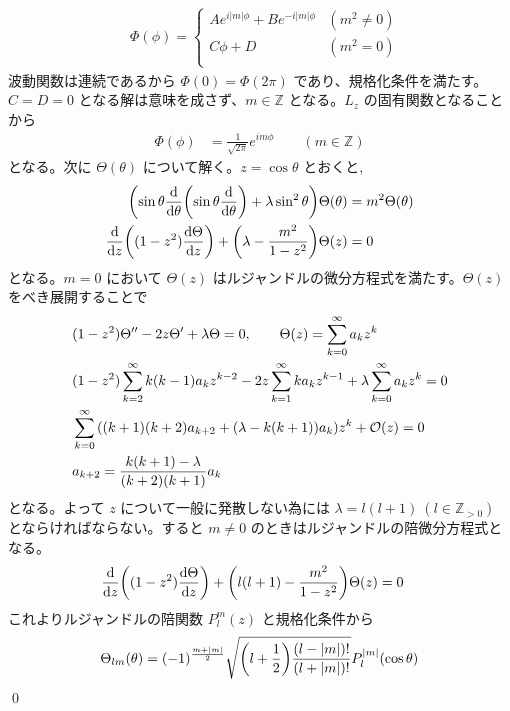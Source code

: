 \documentclass[uplatex,dvipdfmx,a4paper,11pt]{jlreq}
\makeatletter
\newcommand{\ZZ}{\mathbb{Z}}
\theoremstyle{definition}
\renewenvironment{proof}[1][\proofname]{\par
  \normalfont
  \topsep6\p@\@plus6\p@ \trivlist
  \item[\hskip\labelsep{\bfseries #1}\@addpunct{\bfseries}]\ignorespaces\quad\par
}{%
  \qed\endtrivlist\@endpefalse
}
\renewcommand\proofname{証明}
\makeatother
\begin{document}
\begin{proof}
\begin{align}
     & \Phi(\phi) = \begin{cases}
                      Ae^{i|m|\phi} + Be^{-i|m|\phi} & (m^2 \neq 0) \\
                      C\phi + D                      & (m^2 = 0)    \\
                    \end{cases}
  \end{align}
  波動関数は連続であるから $\Phi(0) = \Phi(2\pi)$ であり、規格化条件を満たす。$C = D = 0$ となる解は意味を成さず、$m\in\ZZ$ となる。$L_z$ の固有関数となることから
  \begin{align}
    \Phi(\phi) & = \frac{1}{\sqrt{2\pi}}e^{im\phi} \qquad (m\in\ZZ)
  \end{align}
  となる。次に $\Theta(\theta)$ について解く。$z = \cos\theta$ とおくと,
  \begin{align}
    \qty(\sin\theta\dv{\theta}\qty(\sin\theta\dv{\theta}) + \lambda \sin^2\theta)\Theta(\theta) & = m^2\Theta(\theta) \\
    \dv{z}\qty((1 - z^2)\dv{\Theta}{z}) + \qty(\lambda - \frac{m^2}{1 - z^2})\Theta(z)          & = 0
  \end{align}
  となる。$m = 0$ において $\Theta(z)$ はルジャンドルの微分方程式を満たす。$\Theta(z)$ をべき展開することで
  \begin{align}
     & (1 - z^2)\Theta'' - 2z\Theta' + \lambda\Theta = 0, \qquad \Theta(z) = \sum_{k = 0}^\infty a_kz^k                          \\
     & (1 - z^2)\sum_{k = 2}^\infty k(k-1)a_kz^{k-2} - 2z\sum_{k = 1}^\infty ka_kz^{k-1} + \lambda\sum_{k = 0}^\infty a_kz^k = 0 \\
     & \sum_{k = 0}^\infty \qty((k+1)(k+2)a_{k+2} + \qty(\lambda - k(k+1))a_k)z^k + \mathcal{O}(z) = 0                           \\
     & a_{k+2} = \frac{k(k+1) - \lambda}{(k+2)(k+1)}a_k
  \end{align}
  となる。よって $z$ について一般に発散しない為には $\lambda = l(l+1)\ (l\in\ZZ_{>0})$ とならければならない。すると $m\neq 0$ のときはルジャンドルの陪微分方程式となる。
  \begin{align}
    \dv{z}\qty((1 - z^2)\dv{\Theta}{z}) + \qty(l(l+1) - \frac{m^2}{1 - z^2})\Theta(z) & = 0
  \end{align}
  これよりルジャンドルの陪関数 $P_l^m(z)$ と規格化条件から
  \begin{align}
    \Theta_{lm}(\theta) & = (-1)^{\frac{m + |m|}{2}}\sqrt{\qty(l + \frac{1}{2})\frac{(l - |m|)!}{(l + |m|)!}}P_l^{|m|}(\cos\theta) \\

\end{align}
\end{proof}
\end{document}
